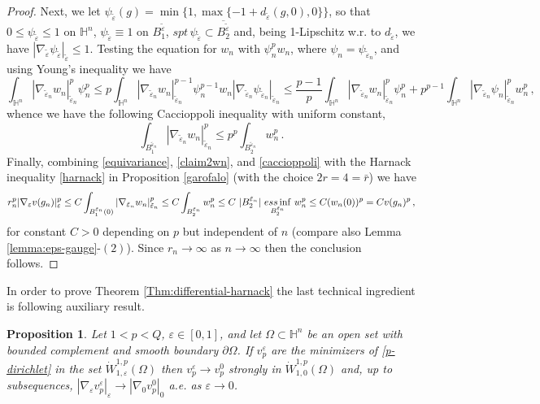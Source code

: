 \documentclass[10pt]{amsart}
\numberwithin{equation}{section}
\newtheorem{proposition}[theorem]{Proposition}
\theoremstyle{definition}
\newcommand{\He}{\mathbb{H}}
\begin{document}
\begin{proof}
Next, we let $\psi_{\tilde{\varepsilon}}(g)=\min \{ 1, \max \{ -1+d_{\tilde{\varepsilon}}(g,0) , 0 \} \}$, 
so that $0 \leq \psi_{\tilde{\varepsilon}} \leq 1$ on $\He^n$, $\psi_{\tilde{\varepsilon}}\equiv 1$ on 
$B_1^{ \tilde{\varepsilon} }$, 
$spt \,  \psi_{\tilde{\varepsilon}}  \subset  \overline{B_2^{\tilde{\varepsilon}}}$ and, being 1-Lipschitz w.r. to $d_{\tilde{\varepsilon}}$, we have $|\nabla_{\tilde{\varepsilon} }  \psi_{\tilde{\varepsilon}} |_{\tilde{\varepsilon}} \leq 1$. Testing the equation for $w_n$ with $\psi_n^p w_n$, where $\psi_n=\psi_{\tilde{\varepsilon}_n}$, and using Young's inequality we have 
 \[ \int_{\He^n}| \nabla_{\tilde{\varepsilon}_n} w_n|^p_{\tilde{\varepsilon}_n} \psi_n^p \leq p \int_{\He^n}  | \nabla_{\tilde{\varepsilon}_n} w_n|^{p-1}_{\tilde{\varepsilon}_n} \psi_n^{p-1} w_n |\nabla_{\tilde{\varepsilon}_n }  \psi_{\tilde{\varepsilon}_n} |_{\tilde{\varepsilon}_n} \leq \frac{p-1}p  \int_{\He^n}| \nabla_{\tilde{\varepsilon}_n} w_n|^p_{\tilde{\varepsilon}_n} \psi_n^p +p^{p-1}  \int_{\He^n}| \nabla_{\tilde{\varepsilon}_n} \psi_n|^p_{\tilde{\varepsilon}_n} w_n^p \, ,\]
whence we have the following Caccioppoli inequality with uniform constant, 
\begin{equation}
\label{caccioppoli}
	 \int_{ B_1^{\tilde{\varepsilon}_n}} | \nabla_{\tilde{\varepsilon}_n} w_n|^p_{\tilde{\varepsilon}_n} \leq p^p   \int_{ B_2^{\tilde{\varepsilon}_n}}  w_n^p \, .
\end{equation}
Finally, combining \eqref{equivariance}, \eqref{claim2wn}, and \eqref{caccioppoli} with the Harnack inequality \eqref{harnack} in Proposition \ref{garofalo} (with the choice $2r=4=\bar{r}$) we have
\[ r^p_n |\nabla_\varepsilon v(g_n)|^p_\varepsilon \leq C    \int_{ B_1^{\tilde{\varepsilon}_n}(0)} |\nabla_{\tilde{\varepsilon}_n} w_n|_{\tilde{\varepsilon}_n}^p  \leq C  \int_{ B_2^{\tilde{\varepsilon}_n}}  w_n^p \leq  C \, \, | B_2^{\tilde{\varepsilon}_n}  |\, \,\underset{B_2^{\tilde{\varepsilon}_n}}{\rm{ess} \inf} \,\,w^p_n\leq C (w_n(0))^p=C v(g_n)^p \, ,\]
for constant $C>0$ depending on $p$ but independent of $n$ (compare also Lemma \ref{lemma:eps-gauge}-$(2)$).  Since $r_n \to \infty$ as $n \to \infty$ then the conclusion follows.
\end{proof} 


In order to prove Theorem \ref{Thm:differential-harnack} the last technical ingredient is following auxiliary result. 
\begin{proposition}
\label{eps-limit}
	Let  $1<p<Q$, $\varepsilon \in [0,1]$, and let $\Omega \subset \He^n$ be an open set with bounded complement and smooth boundary $\partial \Omega$. If $v^\varepsilon_p$ are the minimizers of \eqref{p-dirichlet} in the set $\dot{W}
^{1,p}_{1, \varepsilon} (\Omega)$ then $v^\varepsilon_p \to v^0_p$ strongly in $\dot{W}
^{1,p}_{1, 0} (\Omega)$ and, up to subsequences, $|\nabla_\varepsilon v^\varepsilon_p|_\varepsilon \to |\nabla_0 v^0_p|_0$ a.e. as $\varepsilon \to 0$.
\end{proposition}
\end{document}
